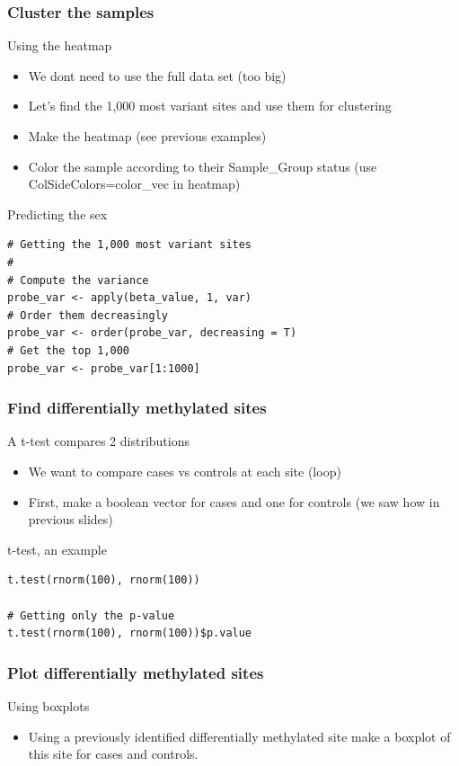 \documentclass[10pt]{beamer}
\newenvironment{xframe}[2][]
  {\begin{frame}[fragile,environment=xframe,#1]
  \frametitle{#2}}
  {\end{frame}}
\begin{document}
\begin{xframe}{Cluster the samples}
  \begin{block}{Using the heatmap}
    \begin{itemize}
      \item We dont need to use the full data set (too big)
      \item Let's find the 1,000 most variant sites and use them for clustering
      \item Make the heatmap (see previous examples)
      \item Color the sample according to their Sample_Group status (use
      ColSideColors=color_vec in heatmap)
    \end{itemize}
    \begin{exampleblock}{Predicting the sex}
\begin{verbatim}
# Getting the 1,000 most variant sites
#
# Compute the variance
probe_var <- apply(beta_value, 1, var)
# Order them decreasingly
probe_var <- order(probe_var, decreasing = T)
# Get the top 1,000
probe_var <- probe_var[1:1000]
\end{verbatim}  
  \end{exampleblock}   
  \end{block}
\end{xframe}


\begin{xframe}{Find differentially methylated sites}
  \begin{block}{A t-test compares 2 distributions}
    \begin{itemize}
      \item We want to compare {\sf cases} vs {\sf controls} at each site
      (loop)
      \item First, make a boolean vector for cases and one for controls (we saw
      how in previous slides)
    \end{itemize}
    \begin{exampleblock}{t-test, an example}
\begin{verbatim}
t.test(rnorm(100), rnorm(100))

# Getting only the p-value
t.test(rnorm(100), rnorm(100))$p.value

\end{verbatim}  
  \end{exampleblock}   
  \end{block}
\end{xframe}

\begin{xframe}{Plot differentially methylated sites}
  \begin{block}{Using boxplots}
    \begin{itemize}
      \item Using a previously identified differentially methylated site make a
      boxplot of this site for {\sf cases} and {\sf controls}.
    \end{itemize}
  \end{block}
\end{xframe}
\end{document}
